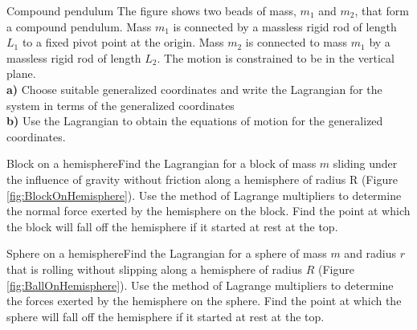 \begin{problem}{Compound pendulum}
\label{prob_Lagrange_6}
The figure shows two beads of mass, $m_1$ and $m_2$, that form a compound pendulum. Mass $m_1$ is connected by a massless rigid rod of length $L_1$ to a fixed pivot point at the origin. Mass $m_2$ is connected to mass $m_1$ by a massless rigid rod of length $L_2$. The motion is constrained to be in the vertical plane.
\\
\textbf{a)} Choose suitable generalized coordinates and write the Lagrangian for the system in terms of the generalized coordinates\\
\textbf{b)} Use the Lagrangian to obtain the equations of motion for the generalized coordinates.
\end{problem}

\begin{problem}{Block on a hemisphere}Find the Lagrangian for a block of mass $m$ sliding under the influence of gravity without friction along a hemisphere of radius R (Figure \ref{fig:BlockOnHemisphere}). Use the method of Lagrange multipliers to determine the normal force exerted by the hemisphere on the block. Find the point at which the block will fall off the hemisphere if it started at rest at the top.
\label{prob_Lagrange_7}
\end{problem}

\begin{problem}{Sphere on a hemisphere}Find the Lagrangian for a sphere of mass $m$ and radius $r$ that is rolling without slipping along a hemisphere of radius $R$ (Figure \ref{fig:BallOnHemisphere}). Use the method of Lagrange multipliers to determine the forces exerted by the hemisphere on the sphere. Find the point at which the sphere will fall off the hemisphere if it started at rest at the top.
\label{prob_Lagrange_8}
\end{problem}

